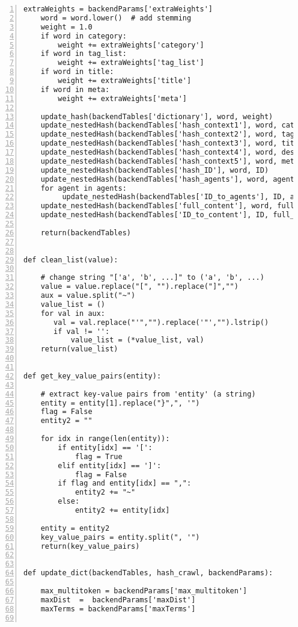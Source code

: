 \documentclass[10pt]{article}
\begin{document}
{\begin{lstlisting}[numbers=left,basicstyle=\ttfamily\footnotesize]
    extraWeights = backendParams['extraWeights']
    word = word.lower()  # add stemming
    weight = 1.0         
    if word in category:   
        weight += extraWeights['category']
    if word in tag_list:
        weight += extraWeights['tag_list']
    if word in title:
        weight += extraWeights['title']
    if word in meta:
        weight += extraWeights['meta']

    update_hash(backendTables['dictionary'], word, weight)
    update_nestedHash(backendTables['hash_context1'], word, category) 
    update_nestedHash(backendTables['hash_context2'], word, tag_list) 
    update_nestedHash(backendTables['hash_context3'], word, title) 
    update_nestedHash(backendTables['hash_context4'], word, description) # takes space, don't build?
    update_nestedHash(backendTables['hash_context5'], word, meta) 
    update_nestedHash(backendTables['hash_ID'], word, ID) 
    update_nestedHash(backendTables['hash_agents'], word, agents) 
    for agent in agents:
         update_nestedHash(backendTables['ID_to_agents'], ID, agent) 
    update_nestedHash(backendTables['full_content'], word, full_content) # takes space, don't nuild?
    update_nestedHash(backendTables['ID_to_content'], ID, full_content)

    return(backendTables)

 
def clean_list(value):

    # change string "['a', 'b', ...]" to ('a', 'b', ...)
    value = value.replace("[", "").replace("]","")
    aux = value.split("~")
    value_list = ()
    for val in aux:
       val = val.replace("'","").replace('"',"").lstrip()
       if val != '':
           value_list = (*value_list, val)
    return(value_list)


def get_key_value_pairs(entity):

    # extract key-value pairs from 'entity' (a string)
    entity = entity[1].replace("}",", '")
    flag = False
    entity2 = ""

    for idx in range(len(entity)):
        if entity[idx] == '[':
            flag = True
        elif entity[idx] == ']':
            flag = False
        if flag and entity[idx] == ",":
            entity2 += "~"
        else:
            entity2 += entity[idx]

    entity = entity2
    key_value_pairs = entity.split(", '") 
    return(key_value_pairs)


def update_dict(backendTables, hash_crawl, backendParams):

    max_multitoken = backendParams['max_multitoken'] 
    maxDist  =  backendParams['maxDist']     
    maxTerms = backendParams['maxTerms']


\end{lstlisting}}
\end{document}
